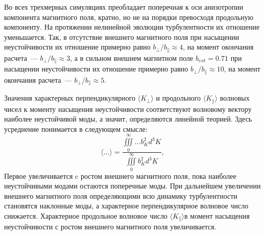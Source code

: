 Во всех трехмерных симуляциях преобладает поперечная к оси анизотропии компонента магнитного поля, кратно, но не на порядки превосходя продольную компоненту. На протяжении нелинейной эволюции турбулентности их отношение уменьшается. Так, в отсутствие внешнего магнитного поля при насыщении неустойчивости их отношение примерно равно $b_\perp/b_\|\approx4$, на момент окончания расчета~--- $b_\perp/b_\|\approx3$, а в сильном внешнем магнитном поле $b_{ext}=0.71$ при насыщении неустойчивости их отношение примерно равно $b_\perp/b_\|\approx10$,  на момент окончания расчета~--- $b_\perp/b_\|\approx5$. 

Значения характерных перпендикулярного $\langle K_\perp\rangle$ и продольного $\langle K_\|\rangle$ волновых чисел к моменту насыщения неустойчивости соответствуют волновому вектору наиболее неустойчивой моды, а значит, определяются линейной теорией. Здесь усреднение понимается в следующем смысле:
\begin{equation}
\label{eq:angles}
\langle...\rangle=\frac{\iiint\limits_0^\infty...b_K^2 d^3K}{\iiint\limits_0^\infty b_K^2 d^3K} ,
\end{equation}
Первое увеличивается c ростом внешнего магнитного поля, пока наиболее неустойчивыми модами остаются поперечные моды. При дальнейшем увеличении внешнего магнитного поля определяющими всю динамику турбулентности становятся наклонные моды, а характерное перпендикулярное волновое число снижается. Характерное продольное волновое число $\langle K_\|\rangle$в момент насыщения неустойчивости с ростом внешнего магнитного поля увеличивается.

